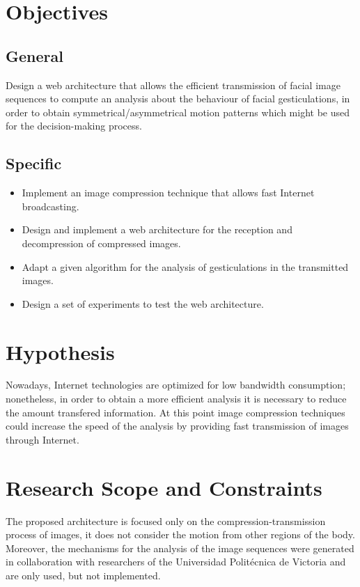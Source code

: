 \documentclass[12pt,letterpaper,titlepage]{book}
\begin{document}
\section{Objectives}
\subsection{General}
Design a web architecture that allows the efficient transmission of facial image sequences to compute an analysis about the behaviour of facial gesticulations, in order to obtain symmetrical/asymmetrical motion patterns which might be used for the decision-making process.
\subsection{Specific}
\begin{itemize}
\item Implement an image compression technique that allows fast Internet broadcasting.
\item Design and implement a web architecture for the reception and decompression of compressed images.
\item Adapt a given algorithm for the analysis of gesticulations in the transmitted images.
\item Design a set of experiments to test the web architecture.
\end{itemize}

\section{Hypothesis}\label{hipotesis}
Nowadays, Internet technologies are optimized for low bandwidth consumption; nonetheless, in order to obtain a more efficient analysis it is necessary to reduce the amount transfered information. At this point image compression techniques could increase the speed of the analysis by providing fast transmission of images through Internet.

\section{Research Scope and Constraints}
The proposed architecture is focused only on the compression-transmission process of images, it does not consider the motion from other regions of the body. Moreover, the mechanisms for the analysis of the image sequences were generated in collaboration with researchers of the Universidad Polit\'ecnica de Victoria and are only used, but not implemented.
\end{document}
